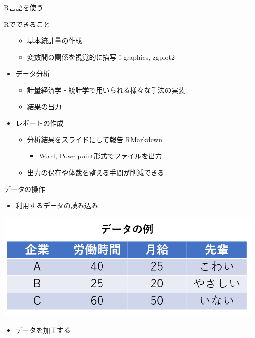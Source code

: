 \documentclass[
  ignorenonframetext,
]{beamer}
\providecommand{\tightlist}{%
  \setlength{\itemsep}{0pt}\setlength{\parskip}{0pt}}
\begin{document}
\begin{frame}[fragile]{R言語を使う}
\begin{block}{Rでできること}
\begin{itemize}
  \begin{itemize}
  \tightlist
  \item
    基本統計量の作成
  \item
    変数間の関係を視覚的に描写：graphics, ggplot2
  \end{itemize}
\item
  データ分析

  \begin{itemize}
  \tightlist
  \item
    計量経済学・統計学で用いられる様々な手法の実装
  \item
    結果の出力
  \end{itemize}
\item
  レポートの作成

  \begin{itemize}
  \item
    分析結果をスライドにして報告 RMarkdown

    \begin{itemize}
    \tightlist
    \item
      Word, Powerpoint形式でファイルを出力
    \end{itemize}
  \item
    出力の保存や体裁を整える手間が削減できる
  \end{itemize}
\end{itemize}
\end{block}

\begin{block}{データの操作}
\protect\hypertarget{ux30c7ux30fcux30bfux306eux64cdux4f5c}{}
\begin{itemize}
\tightlist
\item
  利用するデータの読み込み
\end{itemize}

\begin{center}\includegraphics[width=0.7\linewidth]{figs/data_rei} \end{center}

\begin{itemize}
\item
  データを加工する


\end{itemize}
\end{block}
\end{frame}
\end{document}
